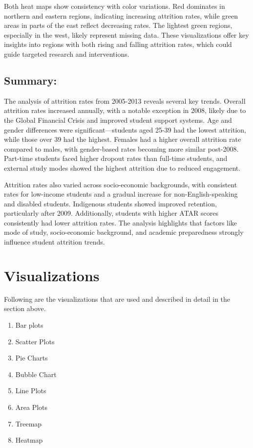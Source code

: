 \documentclass[conference]{IEEEtran}
\begin{document}
Both heat maps show consistency with color variations. Red dominates in northern and eastern regions, indicating increasing attrition rates, while green areas in parts of the east reflect decreasing rates. The lightest green regions, especially in the west, likely represent missing data. These visualizations offer key insights into regions with both rising and falling attrition rates, which could guide targeted research and interventions.

\subsection{Summary: }
The analysis of attrition rates from 2005-2013 reveals several key trends. Overall attrition rates increased annually, with a notable exception in 2008, likely due to the Global Financial Crisis and improved student support systems. Age and gender differences were significant—students aged 25-39 had the lowest attrition, while those over 39 had the highest. Females had a higher overall attrition rate compared to males, with gender-based rates becoming more similar post-2008. Part-time students faced higher dropout rates than full-time students, and external study modes showed the highest attrition due to reduced engagement.

Attrition rates also varied across socio-economic backgrounds, with consistent rates for low-income students and a gradual increase for non-English-speaking and disabled students. Indigenous students showed improved retention, particularly after 2009. Additionally, students with higher ATAR scores consistently had lower attrition rates. The analysis highlights that factors like mode of study, socio-economic background, and academic preparedness strongly influence student attrition trends.

\section{Visualizations}
Following are the visualizations that are used and described
in detail in the section above.
\begin{enumerate}
    \item Bar plots
    \item Scatter Plots
    \item Pie Charts
    \item Bubble Chart
    \item Line Plots
    \item Area Plots
    \item Treemap
    \item Heatmap
    
\end{enumerate}
\end{document}
